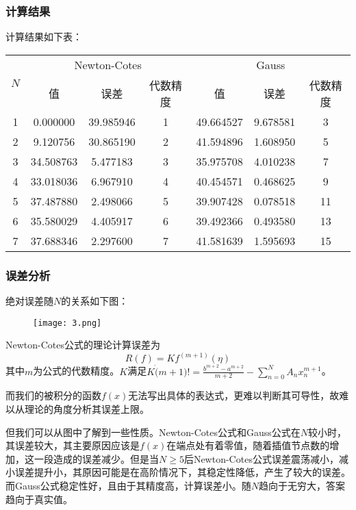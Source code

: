 \documentclass[UTF8]{ctexart}
\begin{document}
	\subsubsection{计算结果}	
	计算结果如下表：
	\begin{center}
		\begin{tabular}{ |c|c|c|c|c|c|c| } 
			\hline
			\multirow{2}{1em}{$N$}  & \multicolumn{3}{|c|}{Newton-Cotes} & \multicolumn{3}{|c|}{Gauss} \\ \cline{2-7} 
			& 值 & 误差 & 代数精度 & 值 & 误差 & 代数精度 \\ \hline
			1 & 0.000000 & 39.985946 & 1 & 49.664527 & 9.678581 & 3 \\ \hline
			2 & 9.120756 & 30.865190 & 2 & 41.594896 & 1.608950 & 5 \\ \hline
			3 & 34.508763 & 5.477183 & 3 & 35.975708 & 4.010238 & 7 \\ \hline
			4 & 33.018036 & 6.967910 & 4 & 40.454571 & 0.468625 & 9 \\ \hline
			5 & 37.487880 & 2.498066 & 5 & 39.907428 & 0.078518 & 11 \\ \hline
			6 & 35.580029 & 4.405917 & 6 & 39.492366 & 0.493580 & 13 \\ \hline
			7 & 37.688346 & 2.297600 & 7 & 41.581639 & 1.595693 & 15 \\
			\hline
		\end{tabular}
	\end{center}

	\subsubsection{误差分析}
	
	绝对误差随$N$的关系如下图：
	
	\begin{figure}[h]
		\centerline{\texttt{[image: 3.png]}}
	\end{figure}

	Newton-Cotes公式的理论计算误差为
	\[ R(f) = Kf^{(m+1)}(\eta)\]
	其中$m$为公式的代数精度。$K$满足$K \dot (m+1)! = \frac{b^{m+2}-a^{m+2}}{m+2} - \sum_{n=0}^{N}A_nx_n^{m+1}$。
	
	而我们的被积分的函数$f(x)$无法写出具体的表达式，更难以判断其可导性，故难以从理论的角度分析其误差上限。
	
	但我们可以从图中了解到一些性质。Newton-Cotes公式和Gauss公式在$N$较小时，其误差较大，其主要原因应该是$f(x)$在端点处有着零值，随着插值节点数的增加，这一段造成的误差减少。但是当$N \geq 5$后Newton-Cotes公式误差震荡减小，减小误差提升小，其原因可能是在高阶情况下，其稳定性降低，产生了较大的误差。而Gauss公式稳定性好，且由于其精度高，计算误差小。随$N$趋向于无穷大，答案趋向于真实值。
	
\end{document}
